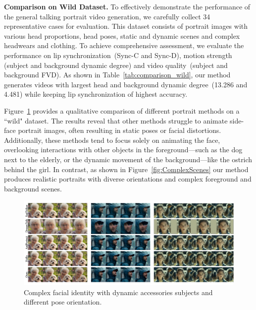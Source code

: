 


\noindent\textbf{Comparison on Wild Dataset.} 
To effectively demonstrate the performance of the general talking portrait video generation, we carefully collect 34 representative cases for evaluation. This dataset consists of portrait images with various head proportions, head poses, static and dynamic scenes and complex headwears and clothing. To achieve comprehensive assessment, we evaluate the performance on lip synchronization~(Sync-C and Sync-D), motion strength (subject and background dynamic degree) and  video quality~(subject and background FVD).
As shown in Table~\ref{tab:comparison_wild}, our method generates videos with largest head and background dynamic degree~(13.286 and 4.481) while keeping lip synchronization of highest accuracy. 

Figure~\ref{fig:portrait_complex_face} provides a qualitative comparison of different portrait methods on a ``wild" dataset. The results reveal that other methods struggle to animate side-face portrait images, often resulting in static poses or facial distortions. Additionally, these methods tend to focus solely on animating the face, overlooking interactions with other objects in the foreground---such as the dog next to the elderly, or the dynamic movement of the background---like the ostrich behind the girl. In contrast, as shown in Figure~\ref{fig:ComplexScenes} our method produces realistic portraits with diverse orientations and complex foreground and background scenes.



\begin{figure}[t!]
    \hspace{-2.5mm}
    \centering    \includegraphics[width=1.01\linewidth]{figs/method_comparison3_2.jpg}
    \vspace{-7mm}
    \caption{Complex facial identity with dynamic accessories subjects and different pose orientation.}
    
    \label{fig:portrait_complex_face}
    \vspace{2mm}
\end{figure}


